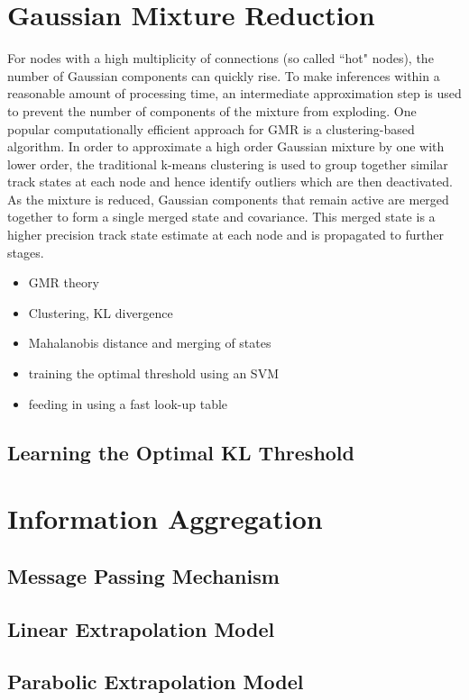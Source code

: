 \section{Gaussian Mixture Reduction}
For nodes with a high multiplicity of connections (so called ``hot" nodes), the number of Gaussian components can quickly rise. To make inferences within a reasonable amount of processing time, an intermediate approximation step is used to prevent the number of components of the mixture from exploding. One popular computationally efficient approach for GMR is a clustering-based algorithm. In order to approximate a high order Gaussian mixture by one with lower order, the traditional k-means clustering \cite{kmeans} is used to group together similar track states at each node and hence identify outliers which are then deactivated. As the mixture is reduced, Gaussian components that remain active are merged together to form a single merged state and covariance. This merged state is a higher precision track state estimate at each node and is propagated to further stages.

\begin{itemize}
    \item GMR theory
    \item Clustering, KL divergence
    \item Mahalanobis distance and merging of states
    \item training the optimal threshold using an SVM
    \item feeding in using a fast look-up table
\end{itemize}
\subsection{Learning the Optimal KL Threshold}


\section{Information Aggregation}
\subsection{Message Passing Mechanism}
\subsection{Linear Extrapolation Model}
\subsection{Parabolic Extrapolation Model}
